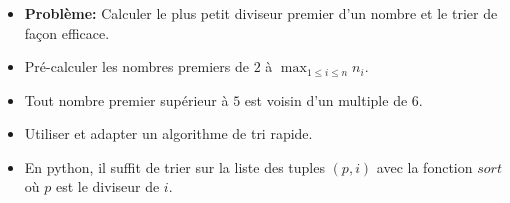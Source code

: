 \begin{frame}
    \frametitle{\problemtitle}
    \begin{itemize}
        \item<+-> \textbf{Problème:} Calculer le plus petit diviseur premier d'un nombre et le trier de façon efficace.
        \item<+-> Pré-calculer les nombres premiers de $2$ à $\max_{1\le i\le n} n_i$.
        \item<+-> Tout nombre premier supérieur à $5$ est voisin d'un multiple de $6$.
        \item<+-> Utiliser et adapter un algorithme de tri rapide.
        \item<+-> En python, il suffit de trier sur la liste des tuples $(p, i)$ avec la fonction $sort$ où $p$ est le diviseur de $i$.

    \end{itemize}
\end{frame}
